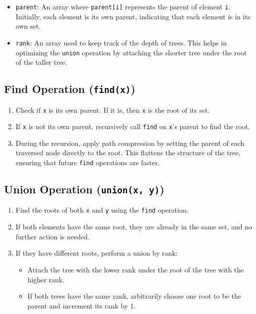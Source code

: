 \begin{itemize}
    \item \texttt{parent}:  
    An array where \texttt{parent[i]} represents the parent of element \texttt{i}. Initially, each element is its own parent, indicating that each element is in its own set.
    
    \item \texttt{rank}:  
    An array used to keep track of the depth of trees. This helps in optimizing the \texttt{union} operation by attaching the shorter tree under the root of the taller tree.
\end{itemize}

\subsection*{Find Operation (\texttt{find(x)})}

\begin{enumerate}
    \item Check if \texttt{x} is its own parent. If it is, then \texttt{x} is the root of its set.
    \item If \texttt{x} is not its own parent, recursively call \texttt{find} on \texttt{x}'s parent to find the root.
    \item During the recursion, apply path compression by setting the parent of each traversed node directly to the root. This flattens the structure of the tree, ensuring that future \texttt{find} operations are faster.
\end{enumerate}

\subsection*{Union Operation (\texttt{union(x, y)})}

\begin{enumerate}
    \item Find the roots of both \texttt{x} and \texttt{y} using the \texttt{find} operation.
    \item If both elements have the same root, they are already in the same set, and no further action is needed.
    \item If they have different roots, perform a union by rank:
    \begin{itemize}
        \item Attach the tree with the lower rank under the root of the tree with the higher rank.
        \item If both trees have the same rank, arbitrarily choose one root to be the parent and increment its rank by 1.
    \end{itemize}
\end{enumerate}

